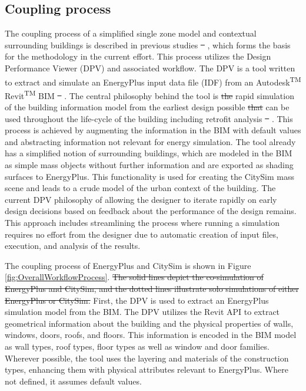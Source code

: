 \documentclass{tBPS2e}
\theoremstyle{plain}
\theoremstyle{definition}
\theoremstyle{remark}
\newcommand{\noteDT}[1]{\footnote{\textcolor{green}{#1}}}
\providecommand{\DIFadd}[1]{{\protect\color{blue}\uwave{#1}}} %
\providecommand{\DIFdel}[1]{{\protect\color{red}\sout{#1}}}                      %
\providecommand{\DIFaddbegin}{} %
\providecommand{\DIFaddend}{} %
\providecommand{\DIFdelbegin}{} %
\providecommand{\DIFdelend}{} %
\begin{document}
\subsection{Coupling process} 
The coupling process of a simplified single zone
model and contextual surrounding buildings is described in previous studies
\DIFdelbegin \DIFdel{\mbox{%
\citep{thomas_multiscale_2014}}%
}\DIFdelend \DIFaddbegin \DIFadd{\mbox{%
\citep{thomas2014multiscale}}%
}\DIFaddend , which forms the basis for the methodology
in the current effort. This process utilizes the Design Performance Viewer
(DPV) and associated workflow. The DPV is a tool written to extract and
simulate an EnergyPlus input data file (IDF) from an
Autodesk\textsuperscript{TM} Revit\textsuperscript{TM} BIM
\DIFdelbegin \DIFdel{\mbox{%
\citep{schlueter_building_2009}}%
}\DIFdelend \DIFaddbegin \DIFadd{\mbox{%
\citep{Schlueter2009}}%
}\DIFaddend . The central philosophy behind the tool is \DIFdelbegin \DIFdel{the }\DIFdelend \DIFaddbegin \DIFadd{a }\DIFaddend rapid simulation
of the building information model from the earliest design possible \DIFdelbegin \DIFdel{that }\DIFdelend \DIFaddbegin \DIFadd{and }\DIFaddend can be
used throughout the life-cycle of the building including retrofit analysis
\DIFdelbegin \DIFdel{\mbox{%
\citep{miller_bim-extracted_2014}}%
}\DIFdelend \DIFaddbegin \DIFadd{\mbox{%
\citep{Miller:2014tu}}%
}\DIFaddend . This process is achieved by augmenting the information
in the BIM with default values and abstracting information not relevant for
energy simulation. The tool already has a simplified notion of surrounding
buildings, which are modeled in the BIM as simple mass objects without further
information and are exported as shading surfaces to EnergyPlus. This
functionality is used for creating the CitySim mass scene and leads to a crude
model of the urban context of the building. The current DPV philosophy of
allowing the designer to iterate rapidly on early design decisions based on
feedback about the performance of the design remains. This approach includes
streamlining the process where running a simulation requires no effort from
the designer due to automatic creation of input files, execution, and analysis
of the results.%

The coupling process of EnergyPlus and CitySim is shown in Figure
\ref{fig:OverallWorkflowProcess}. \DIFdelbegin \DIFdel{The solid lines depict the co-simulation of EnergyPlus
and CitySim, and the dotted lines illustrate solo simulations of either EnergyPlus or CitySim. 
}\DIFdelend First, the DPV is used to extract an
EnergyPlus simulation model from the BIM. The DPV utilizes the Revit API to
extract geometrical information about the building and the physical properties
of walls, windows, doors, roofs, and floors. This information is encoded in the
BIM model as wall types, roof types, floor types as well as window and door
families. Wherever possible, the tool uses the layering and materials of the
construction types, enhancing them with physical attributes relevant to
EnergyPlus. Where not defined, it assumes default values.
\end{document}
